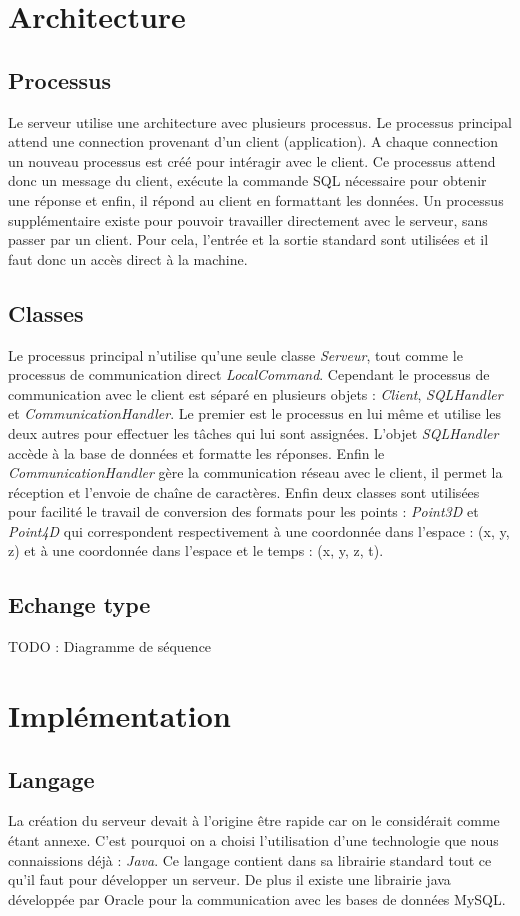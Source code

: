 \documentclass[a4paper, 11pt]{report}
\begin{document}
\section{Architecture}
	\subsection{Processus}
		Le serveur utilise une architecture avec plusieurs processus. Le processus principal attend une connection provenant d'un client (application).
		A chaque connection un nouveau processus est créé pour intéragir avec le client. Ce processus attend donc un message du client, exécute la commande
		SQL nécessaire pour obtenir une réponse et enfin, il répond au client en formattant les données. Un processus supplémentaire existe pour pouvoir
		travailler directement avec le serveur, sans passer par un client. Pour cela, l'entrée et la sortie standard sont utilisées et il faut donc un accès direct à la machine.
	\subsection{Classes}
		Le processus principal n'utilise qu'une seule classe \emph{Serveur}, tout comme le processus de communication direct \emph{LocalCommand}.
		Cependant le processus de communication avec le client est séparé en plusieurs objets : \emph{Client}, \emph{SQLHandler} et \emph{CommunicationHandler}. 
		Le premier est le processus en lui même et utilise les deux autres pour effectuer les tâches qui lui sont assignées. L'objet \emph{SQLHandler} accède à la base de données et formatte les réponses.
		Enfin le \emph{CommunicationHandler} gère la communication réseau avec le client, il permet la réception et l'envoie de chaîne de caractères.
		Enfin deux classes sont utilisées pour facilité le travail de conversion des formats pour les points : \emph{Point3D} et \emph{Point4D} qui correspondent respectivement à une coordonnée dans l'espace : (x, y, z)
		et à une coordonnée dans l'espace et le temps : (x, y, z, t).
	\subsection{Echange type}
		TODO : Diagramme de séquence
\section{Implémentation}
	\subsection{Langage}
		La création du serveur devait à l'origine être rapide car on le considérait comme étant annexe. C'est pourquoi on a choisi l'utilisation d'une
		technologie que nous connaissions déjà : \emph{Java}. Ce langage contient dans sa librairie standard tout ce qu'il faut pour développer un serveur.
		De plus il existe une librairie java développée par Oracle pour la communication avec les bases de données MySQL.
\end{document}
